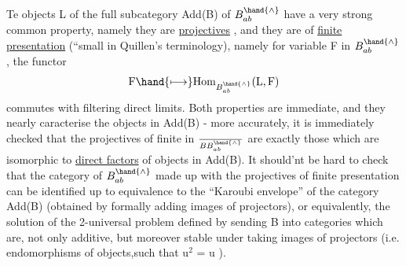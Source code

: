 Te objects  L of the full subcategory  Add(B) of $B^{\hand{\wedge}}_{ab}$ have a very
strong common property,  namely they are \uline{projectives} ,  and they are
of \uline{finite} \uline{presentation}  (``small in Quillen's terminology),
namely for variable F in $B^{\hand{\wedge}}_{ab}$ ,  the functor
\[ \text{F} \hand{\longmapsto} \text{Hom}_{B^{\hand{\wedge}}_{ab}} (\text{L},\text{F}) \]
commutes with filtering direct limits.  Both properties are immediate,
and they nearly caracterise the objects in Add(B) -  more accurately,
it is immediately checked that the projectives of finite  in $\over{B}{B}^{\hand{\wedge}}_{ab}$
are exactly those which are isomorphic to \uline{direct factors} of objects in
Add(B).  It should'nt be hard to check that the category of  $B^{\hand{\wedge}}_{ab}$
made up with the projectives  of finite presentation can be identified
up to equivalence to the ``Karoubi envelope'' of the category Add(B)
(obtained by formally adding images of projectors),  or equivalently,
 the solution of the 2-universal problem defined by sending B into
categories which are,  not only additive,  but moreover stable under
taking images of projectors (i.e. endomorphisms  of objects,such that
u$^{2}$ = u ).


